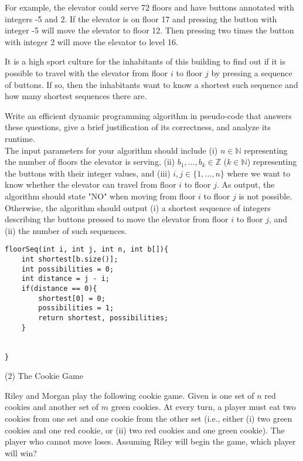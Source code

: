 \documentclass[11pt]{amsart}
\begin{document}
For example, the elevator could serve 72 floors and have buttons annotated with integers -5 and 2. If the elevator is on
floor 17 and pressing the button with integer -5 will move the elevator to floor 12. Then pressing two times the button with
integer 2 will move the elevator to level 16.\medskip

It is a high sport culture for the inhabitants of this building to find out if it is possible to travel with the elevator from floor
$i$ to floor $j$ by pressing a sequence of buttons. If so, then the inhabitants want to know a shortest such sequence
and how many shortest sequences there are.\medskip

Write an efficient dynamic programming algorithm in pseudo-code that answers these questions, give a brief justification
of its correctness, and analyze its runtime.\\

The input parameters for your algorithm should include (i) $n\in \mathbb{N}$ representing the number of floors the 
elevator is serving, (ii) $b_1,\ldots, b_k \in \mathbb{Z}$ ($k\in\mathbb{N}$) representing the buttons with their
integer values, and (iii) $i,j \in \{1,\ldots , n\}$ where we want to know whether the elevator can travel from floor $i$ to floor $j$.
As output, the algorithm should state "NO" when moving from floor $i$ to floor $j$ is not possible. Otherwise, the 
algorithm should output (i) a shortest sequence of integers describing the buttons pressed to move the elevator from floor
$i$ to floor $j$, and (ii) the number of such sequences.

\newpage
\begin{lstlisting}
floorSeq(int i, int j, int n, int b[]){
    int shortest[b.size()];
    int possibilities = 0;
    int distance = j - i;
    if(distance == 0){
        shortest[0] = 0;
        possibilities = 1;
        return shortest, possibilities;
    }


}
\end{lstlisting}

\newpage

(2) The Cookie Game\medskip

Riley and Morgan play the following cookie game. Given is one set of $n$ red cookies and another set of $m$ green 
cookies. At every turn, a player must eat two cookies from one set and one cookie from the other set (i.e., 
either (i) two green cookies and one red cookie, or (ii) two red cookies and one green cookie). The player who 
cannot move loses. Assuming Riley will begin the game, which player will win?\medskip
\end{document}
